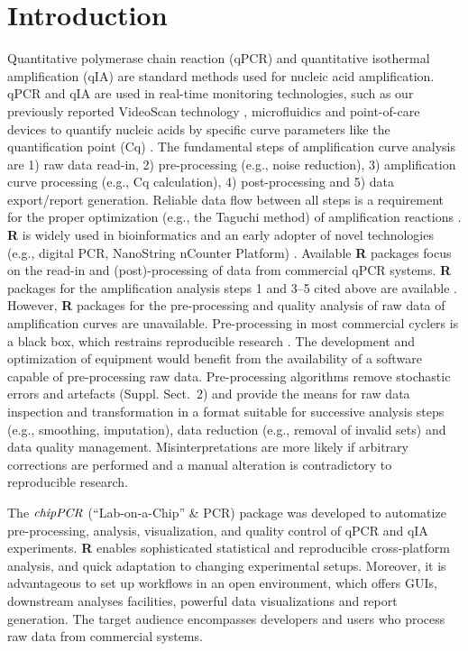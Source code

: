 \documentclass{bioinfo}
\begin{document}
\section{Introduction}

Quantitative polymerase chain reaction (qPCR) and quantitative isothermal 
amplification (qIA) are standard methods used for nucleic acid amplification. 
qPCR and qIA are used in real-time monitoring technologies, such as our 
previously reported VideoScan technology 
\citep{roediger_highly_2013,spiess_impact_2014}, microfluidics and point-of-care 
devices to quantify nucleic acids by specific curve parameters like the 
quantification point (Cq) \citep{pabinger_2014,rodiger_nucleic_2014}. The 
fundamental steps of amplification curve analysis are 1) raw data read-in, 2) 
pre-processing (e.g., noise reduction), 3) amplification curve processing (e.g., 
Cq calculation), 4) post-processing and 5) data export/report generation. 
Reliable data flow between all steps is a requirement for the proper 
optimization (e.g., the Taguchi method) of amplification reactions 
\citep{cobb_1994}. \textbf{R} is widely used in bioinformatics and an early 
adopter of novel technologies (e.g., digital PCR, NanoString nCounter Platform) 
\citep{waggott_2012,pabinger_2014}. Available \textbf{R} packages focus on the 
read-in and (post)-processing of data from commercial qPCR systems. \textbf{R} 
packages for the amplification analysis steps 1 and 3--5 cited above are 
available \citep{perkins_2012,gehlenborg_2013,mccall_2014,pabinger_2014}. 
However, \textbf{R} packages for the pre-processing and quality 
analysis of raw data of amplification curves are unavailable. Pre-processing in most commercial 
cyclers is a black box, which restrains reproducible research 
\citep{Leeper_2014}. The development and optimization of equipment would benefit 
from the availability of a software capable of pre-processing raw data. 
Pre-processing algorithms remove stochastic errors and artefacts (Suppl. 
Sect.~2) and provide the means for raw data inspection and transformation in a 
format suitable for successive analysis steps (e.g., smoothing, imputation), 
data reduction (e.g., removal of invalid sets) and data quality management. 
Misinterpretations are more likely if arbitrary corrections are performed and a 
manual alteration is contradictory to reproducible research.

The $\emph{chipPCR}$ (``Lab-on-a-Chip'' \& PCR) package was 
developed to automatize pre-processing, analysis, visualization, and quality 
control of qPCR and qIA experiments. \textbf{R} enables sophisticated 
statistical and reproducible cross-platform analysis, and quick adaptation to 
changing experimental setups. Moreover, it is advantageous to set up workflows 
in an open environment, which offers GUIs, downstream analyses facilities, 
powerful data visualizations and report generation. The target audience 
encompasses developers and users who process raw data from commercial systems.
\end{document}
